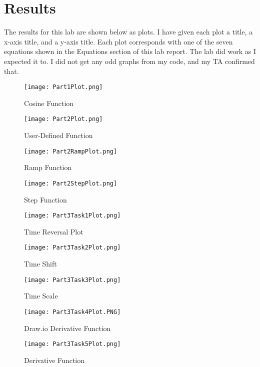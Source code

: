 \documentclass[12pt]{report}
\begin{document}
\section{Results}

The results for this lab are shown below as plots. I have given each plot a title, a x-axis title, and a y-axis title. Each plot corresponds with one of the seven equations shown in the Equations section of this lab report. The lab did work as I expected it to. I did not get any odd graphs from my code, and my TA confirmed that. 

\begin{figure}
\texttt{[image: Part1Plot.png]}
\caption{Cosine Function}
\end{figure}

\begin{figure}
\texttt{[image: Part2Plot.png]}
\caption{User-Defined Function}
\end{figure}

\begin{figure}
\texttt{[image: Part2RampPlot.png]}
\caption{Ramp Function}
\end{figure}

\begin{figure}
\texttt{[image: Part2StepPlot.png]}
\caption{Step Function}
\end{figure}

\begin{figure}
\texttt{[image: Part3Task1Plot.png]}
\caption{Time Reversal Plot}
\end{figure}

\begin{figure}
\texttt{[image: Part3Task2Plot.png]}
\caption{Time Shift}
\end{figure}

\begin{figure}
\texttt{[image: Part3Task3Plot.png]}
\caption{Time Scale}
\end{figure}

\begin{figure}
\texttt{[image: Part3Task4Plot.PNG]}
\caption{Draw.io Derivative Function}
\end{figure}

\begin{figure}
\texttt{[image: Part3Task5Plot.png]}
\caption{Derivative Function}
\end{figure}
\end{document}
